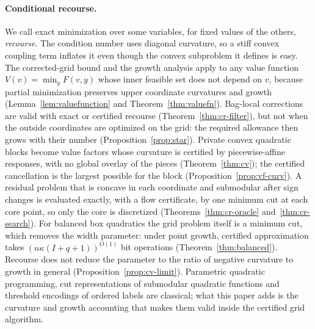 \paragraph{Conditional recourse.}
We call exact minimization over some variables, for fixed values of the
others, \emph{recourse}. The condition number uses diagonal curvature, so a
stiff convex coupling term inflates it even though the convex subproblem it
defines is easy. The corrected-grid bound and the growth analysis apply to
any value function $V(v)=\min_yF(v,y)$ whose inner feasible set does not
depend on $v$, because partial minimization preserves upper coordinate
curvatures and growth (Lemma~\ref{lem:valuefunction} and
Theorem~\ref{thm:valuefn}). Bag-local corrections are valid with exact or
certified recourse (Theorem~\ref{thm:cr-filter}), but not when the outside
coordinates are optimized on the grid: the required allowance then grows with
their number (Proposition~\ref{prop:star}). Private convex quadratic blocks
become value factors whose curvature is certified by piecewise-affine
responses, with no global overlay of the pieces (Theorem~\ref{thm:cv}); the
certified cancellation is the largest possible for the block
(Proposition~\ref{prop:vf-curv}). A residual problem that is concave in each
coordinate and submodular after sign changes is evaluated exactly, with a
flow certificate, by one minimum cut at each core point, so only the core is
discretized (Theorems~\ref{thm:cr-oracle} and~\ref{thm:cr-search}). For
balanced box quadratics the grid problem itself is a minimum cut, which
removes the width parameter: under point growth, certified approximation
takes $(n\kappa(I+q+1))^{O(1)}$ bit operations
(Theorem~\ref{thm:balanced}). Recourse does not reduce the parameter to the ratio of negative curvature to growth in
general (Proposition~\ref{prop:cv-limit}). Parametric quadratic programming,
cut representations of submodular quadratic functions and threshold
encodings of ordered labels are classical; what this paper adds is the
curvature and growth accounting that makes them valid inside the certified
grid algorithm.

